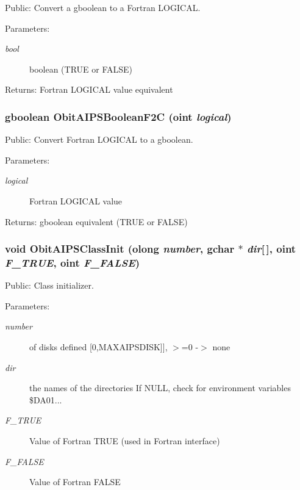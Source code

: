 Public: Convert a gboolean to a Fortran LOGICAL. 

\begin{Desc}
\item[Parameters:]
\begin{description}
\item[{\em bool}]boolean (TRUE or FALSE) \end{description}
\end{Desc}
\begin{Desc}
\item[Returns:]Fortran LOGICAL value equivalent \end{Desc}
\subsubsection{\setlength{\rightskip}{0pt plus 5cm}gboolean Obit\-AIPSBoolean\-F2C ({\bf oint} {\em logical})}\label{ObitAIPS_8h_a25}


Public: Convert Fortran LOGICAL to a gboolean. 

\begin{Desc}
\item[Parameters:]
\begin{description}
\item[{\em logical}]Fortran LOGICAL value \end{description}
\end{Desc}
\begin{Desc}
\item[Returns:]gboolean equivalent (TRUE or FALSE) \end{Desc}
\subsubsection{\setlength{\rightskip}{0pt plus 5cm}void Obit\-AIPSClass\-Init ({\bf olong} {\em number}, gchar $\ast$ {\em dir}[$\,$], {\bf oint} {\em F\_\-TRUE}, {\bf oint} {\em F\_\-FALSE})}\label{ObitAIPS_8h_a11}


Public: Class initializer. 

\begin{Desc}
\item[Parameters:]
\begin{description}
\item[{\em number}]of disks defined [0,MAXAIPSDISK]], $>$=0 -$>$ none \item[{\em dir}]the names of the directories If NULL, check for environment variables \$DA01... \item[{\em F\_\-TRUE}]Value of Fortran TRUE (used in Fortran interface) \item[{\em F\_\-FALSE}]Value of Fortran FALSE \end{description}
\end{Desc}

